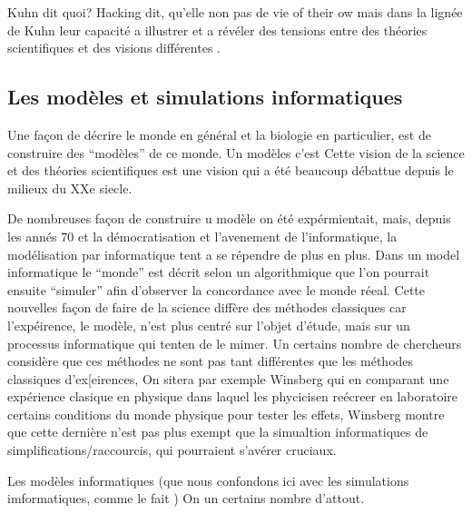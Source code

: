Kuhn dit quoi? 
Hacking \citet{hacking92dothoughtexperimentshavealifeoftheirown} dit, qu'elle non pas de vie of their ow mais dans la lignée de Kuhn  leur capacité a illustrer et a révéler des tensions entre des théories scientifiques et des visions différentes \citep[p. 304]{hacking92dothoughtexperimentshavealifeoftheirown}.



\subsection{Les modèles et simulations informatiques}

Une façon de décrire le monde en général et la biologie en particulier, est de construire des ``modèles'' de ce monde. Un modèles c'est %
Cette vision de la science et des théories scientifiques est une vision qui a été beaucoup débattue depuis le milieux du XXe siecle. 


De nombreuses façon de construire u modèle on été expérmientait, mais, depuis les annés 70 et la démocratisation et l'avenement de l'informatique, la modélisation par informatique tent a se répendre de plus en plus. Dans un model informatique le ``monde'' est décrit selon un algorithmique que l'on pourrait ensuite ``simuler'' afin d'observer la concordance avec le monde réeal. Cette nouvelles façon de faire de la science diffère des méthodes classiques car l'expéirence, le modèle, n'est plus centré sur l'objet d'étude, mais sur un processus informatique qui tenten de le mimer. Un certains nombre de chercheurs considère que ces méthodes ne sont pas tant différentes que les méthodes classiques d'ex[eirences, On sitera par exemple Winsberg qui en comparant une expérience clasique en physique dans laquel les phycicisen reécreer en laboratoire certains conditions du monde physique pour tester les effets, Winsberg montre que cette dernière n'est pas plus exempt que la simualtion informatiques de simplifications/raccourcis, qui pourraient s'avérer cruciaux.

Les modèles informatiques (que nous confondons ici avec les simulations imformatiques, comme le fait \cite{winsberg03simulatedexperimentsmethodologyforavirtualworld}) On un certains nombre d'attout.  


